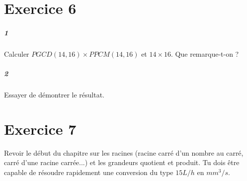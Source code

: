 \documentclass[10pt,a4paper]{article}
\begin{document}
\section{Exercice 6}
\subparagraph{1}Calculer $PGCD(14,16) \times PPCM(14,16)$ et $14 \times 16$. Que remarque-t-on ?
\subparagraph{2}Essayer de démontrer le résultat.
\section{Exercice 7}
Revoir le début du chapitre sur les racines (racine carré d'un nombre au carré, carré d'une racine carrée...) et les grandeurs quotient et produit. Tu dois être capable de résoudre rapidement une conversion du type $15L/h$ en $mm^3/s$.
\end{document}
